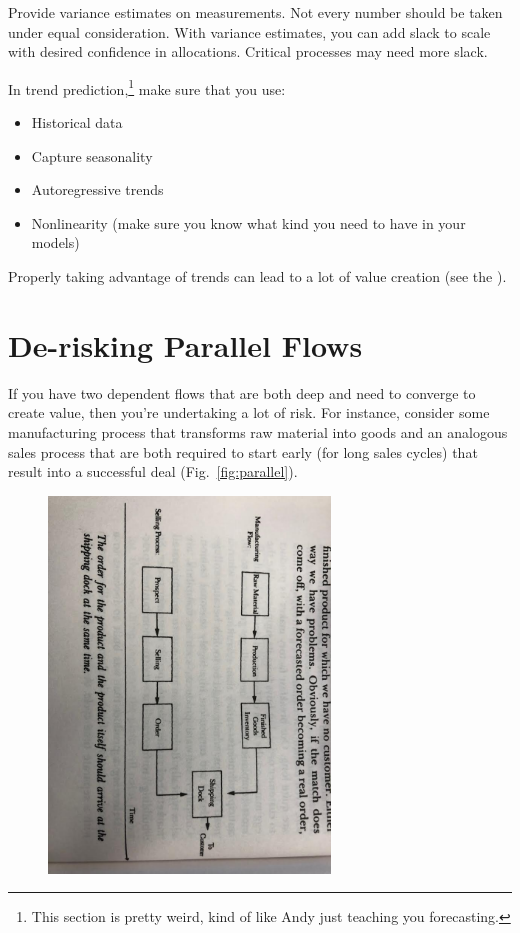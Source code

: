 \documentclass{article}
\begin{document}
Provide variance estimates on measurements. Not every number should be taken under equal consideration. With variance estimates, you can add slack to scale with desired confidence in allocations. Critical processes may need more slack.

In trend prediction,\footnote{This section is pretty weird, kind of like Andy just teaching you forecasting.} make sure that you use:
\begin{itemize}
\item Historical data
\item Capture seasonality
\item Autoregressive trends
\item Nonlinearity (make sure you know what kind you need to have in your models)
\end{itemize}

Properly taking advantage of trends can lead to a lot of value creation (see the ).

\section{De-risking Parallel Flows}

If you have two dependent flows that are both deep and need to converge to create value, then you're undertaking a lot of risk. For instance, consider some manufacturing process that transforms raw material into goods and an analogous sales process that are both required to start early (for long sales cycles) that result into a successful deal (Fig.~\ref{fig:parallel}).

\begin{figure}[h]
  \centering
  \includegraphics[height=10cm]{deep-parallel.pdf}
  \caption{\label{fig:partitioning} }
\end{figure}
\end{document}
